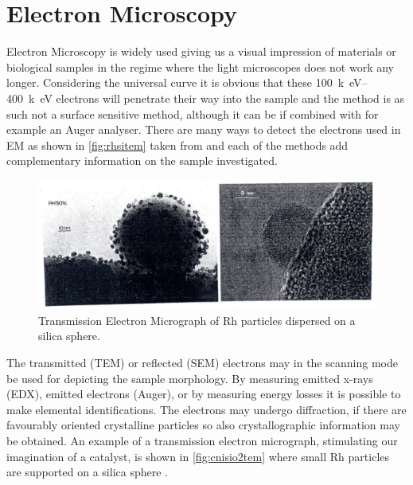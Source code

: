 \section{Electron Microscopy}
Electron Microscopy is widely used giving us a visual impression of materials or biological samples in the regime where the light microscopes does not work any longer. Considering  the universal curve  it is obvious that these \SIrange{100}{400}{k\electronvolt} electrons will penetrate their way into the sample and the method is as such not a surface sensitive method, although it can be if combined with for example an Auger analyser. There are many ways to detect the electrons used in EM as shown in \autoref{fig:rhsitem} taken from \cite{Niemantsverdriet} and each of the methods add complementary information on the sample investigated. 

\begin{figure}[h!]
 	\begin{center}
 	\includegraphics[scale=4]{figures/10_16.png}
 	\caption{Transmission Electron Micrograph of Rh particles dispersed on a silica sphere.}
 	\label{fig:rhsitem}
 	\end{center}
\end{figure} 

The transmitted (TEM) or reflected (SEM) electrons may in the scanning mode be used for depicting the sample morphology. By measuring emitted x-rays (EDX), emitted electrons (Auger), or by measuring energy losses it is possible to make elemental identifications. The electrons may undergo diffraction, if there are favourably oriented crystalline particles so also crystallographic information may be obtained. An example  of a transmission electron micrograph, stimulating our imagination of a catalyst, is shown in \autoref{fig:cnisio2tem} where small Rh particles are supported on a silica sphere \cite{Datye}.

